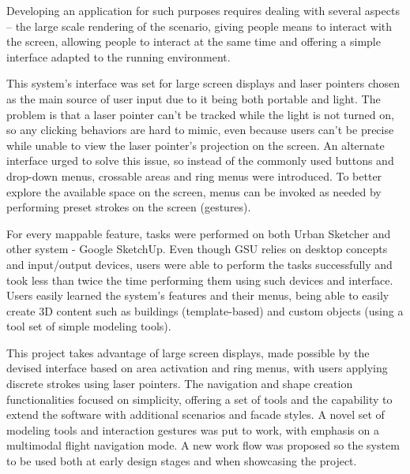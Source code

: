 
Developing an application for such purposes requires dealing with several aspects
-- the large scale rendering of the scenario,
giving people means to interact with the screen,
allowing people to interact at the same time and
offering a simple interface adapted to the running environment.




This system's interface was set for large screen displays and laser pointers chosen as the main source of user input
due to it being both portable and light.
The problem is that a laser pointer can't be tracked while the light is not turned on,
so any clicking behaviors are hard to mimic, even because users can't be 
precise while unable to view the laser pointer's projection on the screen.
An alternate interface urged to solve this issue, so instead of the commonly used buttons and drop-down menus,
crossable areas and ring menus were introduced.
To better explore the available space on the screen,
menus can be invoked as needed by performing preset strokes on the screen (gestures).


For every mappable feature, tasks were performed on both Urban Sketcher and other system - Google SketchUp.
Even though GSU relies on desktop concepts and input/output devices, users were able to perform the tasks
successfully and took less than twice the time performing them using such devices and interface.
Users easily learned the system's features and their menus, being able to easily
create 3D content such as buildings (template-based) and custom objects (using a tool set of simple modeling tools).



This project takes advantage of large screen displays,
made possible by the devised interface based on area activation and ring menus,
with users applying discrete strokes using laser pointers.
The navigation and shape creation functionalities focused on simplicity,
offering a set of tools and the capability to extend the software with additional scenarios and facade styles.
A novel set of modeling tools and interaction gestures was put to work, with emphasis on a multimodal flight navigation mode.
A new work flow was proposed so the system to be used both at early design stages and
when showcasing the project.


